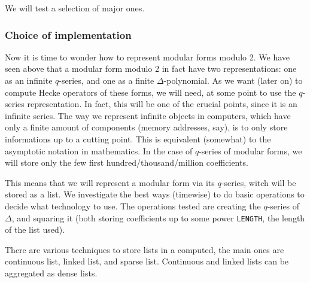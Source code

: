 We will test a selection of major ones.

\subsubsection{Choice of implementation}
Now it is time to wonder how to represent modular forms modulo 2.
We have seen above that a modular form modulo 2 in fact have two representations: one as an infinite $q$-series, and one as a finite $\Delta$-polynomial.
As we want (later on) to compute Hecke operators of these forms, we will need, at some point to use the $q$-series representation.
In fact, this will be one of the crucial points, since it is an infinite series.
The way we represent infinite objects in computers, which have only a finite amount of components (memory addresses, say), is to only store informations up to a cutting point.
This is equivalent (somewhat) to the asymptotic notation in mathematics.
In the case of $q$-series of modular forms, we will store only the few first hundred/thousand/million coefficients.

This means that we will represent a modular form via its $q$-series, witch will be stored as a list.
We investigate the best ways (timewise) to do basic operations to decide what technology to use.
The operations tested are creating the $q$-series of $\Delta$, and squaring it (both storing coefficients up to some power \texttt{LENGTH}, the length of the list used).

There are various techniques to store lists in a computed, the main ones are continuous list, linked list, and sparse list.
Continuous and linked lists can be aggregated as dense lists.

